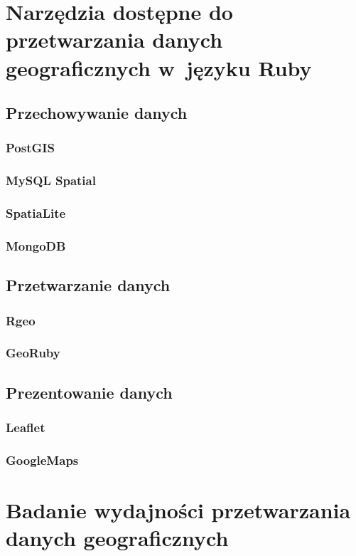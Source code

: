 \documentclass[printmode]{mgr}
\begin{document}
\chapter{Narzędzia dostępne do przetwarzania danych geograficznych w~języku Ruby}
\section{Przechowywanie danych}
\subsection{PostGIS}
\subsection{MySQL Spatial}
\subsection{SpatiaLite}
\subsection{MongoDB}

\section{Przetwarzanie danych}
\subsection{Rgeo}
\subsection{GeoRuby}

\section{Prezentowanie danych}
\subsection{Leaflet}
\subsection{GoogleMaps}



\chapter{Badanie wydajności przetwarzania danych geograficznych}
\end{document}
